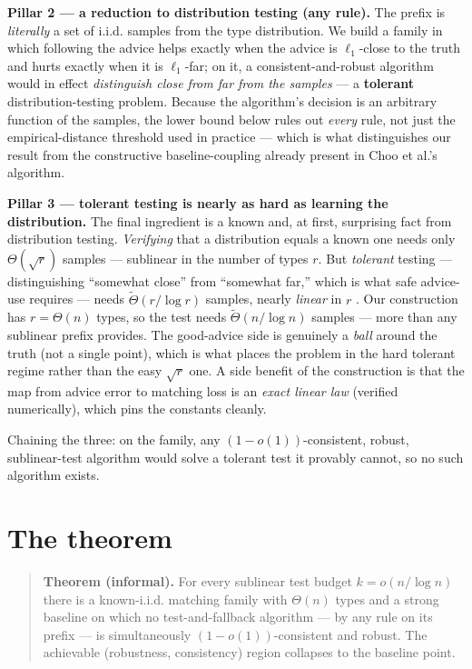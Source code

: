 \textbf{Pillar 2 --- a reduction to distribution testing (any rule).}
The prefix is \emph{literally} a set of i.i.d. samples from the type
distribution. We build a family in which following the advice helps
exactly when the advice is \(\ell_1\)-close to the truth and hurts
exactly when it is \(\ell_1\)-far; on it, a consistent-and-robust
algorithm would in effect \emph{distinguish close from far from the
samples} --- a \textbf{tolerant} distribution-testing problem. Because
the algorithm's decision is an arbitrary function of the samples, the
lower bound below rules out \emph{every} rule, not just the
empirical-distance threshold used in practice --- which is what
distinguishes our result from the constructive baseline-coupling already
present in Choo et al.'s algorithm.

\textbf{Pillar 3 --- tolerant testing is nearly as hard as learning the
distribution.} The final ingredient is a known and, at first, surprising
fact from distribution testing. \emph{Verifying} that a distribution
equals a known one needs only \(\Theta(\sqrt r)\) samples --- sublinear
in the number of types \(r\). But \emph{tolerant} testing ---
distinguishing ``somewhat close'' from ``somewhat far,'' which is what
safe advice-use requires --- needs \(\tilde\Theta(r/\log r)\) samples,
nearly \emph{linear} in \(r\)
\autocite{canonne2022tolerance,valiant2011unseen}. Our construction has
\(r=\Theta(n)\) types, so the test needs \(\tilde\Theta(n/\log n)\)
samples --- more than any sublinear prefix provides. The good-advice
side is genuinely a \emph{ball} around the truth (not a single point),
which is what places the problem in the hard tolerant regime rather than
the easy \(\sqrt r\) one. A side benefit of the construction is that the
map from advice error to matching loss is an \emph{exact linear law}
(verified numerically), which pins the constants cleanly.

Chaining the three: on the family, any \((1-o(1))\)-consistent, robust,
sublinear-test algorithm would solve a tolerant test it provably cannot,
so no such algorithm exists.

\section{The theorem}

\begin{quote}
\textbf{Theorem (informal).} For every sublinear test budget
\(k=o(n/\log n)\) there is a known-i.i.d. matching family with
\(\Theta(n)\) types and a strong baseline on which no test-and-fallback
algorithm --- by any rule on its prefix --- is simultaneously
\((1-o(1))\)-consistent and robust. The achievable (robustness,
consistency) region collapses to the baseline point.
\end{quote}

